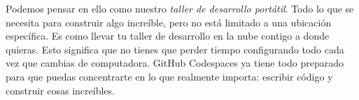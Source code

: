 

Podemos pensar en ello como nuestro \textit{taller de desarrollo portátil}. Todo lo que se necesita
para construir algo increíble, pero no está limitado a una ubicación específica. Es como llevar tu taller
de desarrollo en la nube contigo a donde quieras. Esto significa que no tienes que perder tiempo
configurando todo cada vez que cambias de computadora. GitHub Codespaces ya tiene todo preparado para
que puedas concentrarte en lo que realmente importa: escribir código y construir cosas increíbles.


